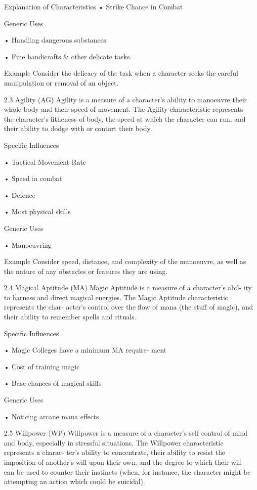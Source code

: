 \begin{Chapter}{Explanation of Characteristics}
• Strike Chance in Combat 

Generic Uses  

• Handling dangerous substances  

• Fine handicrafts \& other delicate tasks. 

Example 
Consider  the  delicacy  of  the  task  when  a 
character seeks the careful  manipulation or removal of an 
object. 

2.3 Agility (AG) 
Agility  is  a  measure  of  a  character’s  ability  to 
manoeuvre  their  whole  body  and  their  speed  of 
movement.  The  Agility  characteristic  represents 
the  character’s  litheness  of  body,  the  speed  at 
which  the  character  can  run,  and  their  ability  to 
dodge with or contort their body. 

Specific Influences  

• Tactical Movement Rate  

• Speed in combat  

• Defence  

• Most physical skills 

Generic Uses  

• Manoeuvring 

Example 
Consider  speed,  distance,  and  complexity 
of the manoeuvre, as well as the nature of any obstacles or 
features they are using. 

2.4 Magical Aptitude (MA) 
Magic Aptitude is a measure of a character’s abil-
ity  to  harness  and  direct  magical  energies.  The 
Magic  Aptitude  characteristic  represents  the  char-
acter’s  control  over  the  flow  of  mana  (the  stuff  of 
magic),  and  their  ability  to  remember  spells  and 
rituals. 

Specific Influences  

•  Magic  Colleges  have  a  minimum  MA  require-
ment  

• Cost of training magic  

• Base chances of magical skills 

Generic Uses  

• Noticing arcane mana effects 

2.5 Willpower (WP) 
Willpower is a measure of a character’s self control 
of mind and body, especially in stressful situations. 
The  Willpower  characteristic  represents  a  charac-
ter’s ability to concentrate, their ability to resist the 
imposition  of  another’s  will  upon  their  own,  and 
the  degree  to  which  their  will  can  be  used  to 
counter  their  instincts  (when,  for  instance,  the 
character  might  be  attempting  an  action  which 
could be suicidal). 


\end{Chapter}
